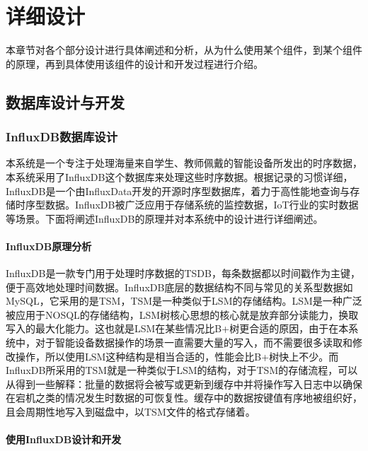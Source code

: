 \documentclass[oneside]{xduugthesis}
\begin{document}
\let\cleardoublepage\clearpage
\chapter{详细设计}

本章节对各个部分设计进行具体阐述和分析，从为什么使用某个组件，到某个组件的原理，再到具体使用该组件的设计和开发过程进行介绍。

\section{数据库设计与开发}

\subsection{InfluxDB数据库设计}

本系统是一个专注于处理海量来自学生、教师佩戴的智能设备所发出的时序数据，本系统采用了InfluxDB这个数据库来处理这些时序数据。根据\cite{InfluxDB维基百科}记录的习惯详细，InfluxDB是一个由InfluxData\cite{InfluxDB维基百科}开发的开源时序型数据库，着力于高性能地查询与存储时序型数据。InfluxDB被广泛应用于存储系统的监控数据，IoT行业\cite{redhat-IoT}的实时数据等场景。下面将阐述InfluxDB的原理并对本系统中的设计进行详细阐述。

\subsubsection{InfluxDB原理分析}

InfluxDB是一款专门用于处理时序数据的TSDB，每条数据都以时间戳作为主键，便于高效地处理时间数据。InfluxDB底层的数据结构不同与常见的关系型数据如MySQL，它采用的是TSM\cite{tencentLSMTSM}，TSM是一种类似于LSM\cite{tencentLSMTSM}的存储结构。LSM是一种广泛被应用于NOSQL\cite{mongodbWhatNoSQL}的存储结构，LSM树核心思想的核心就是放弃部分读能力，换取写入的最大化能力。这也就是LSM在某些情况比B+树\cite{oiwikix6811Wiki}更合适的原因，由于在本系统中，对于智能设备数据操作的场景一直需要大量的写入，而不需要很多读取和修改操作，所以使用LSM这种结构是相当合适的，性能会比B+树快上不少。而InfluxDB所采用的TSM就是一种类似于LSM的结构，对于TSM的存储流程，可以从\cite{InfluxDB官方文档}得到一些解释：批量的数据将会被写或更新到缓存中并将操作写入日志中以确保在宕机之类的情况发生时数据的可恢复性。缓存中的数据按键值有序地被组织好，且会周期性地写入到磁盘中，以TSM文件的格式存储着。

\subsubsection{使用InfluxDB设计和开发}
\end{document}

